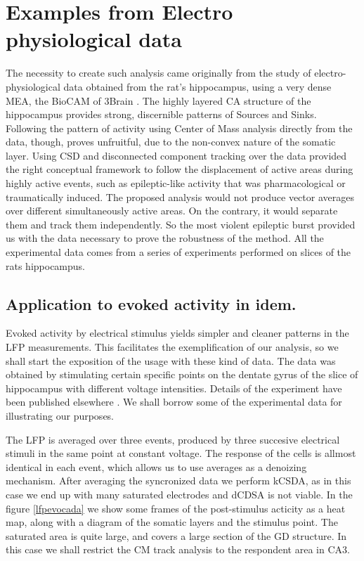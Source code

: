 \documentclass[12pt]{article}
\begin{document}
 
\section{Examples from Electro physiological data}

The necessity to create such analysis came originally from the study of
electro-physiological data obtained from the rat's hippocampus, using
a very dense MEA, the BioCAM of 3Brain \cite{BioCAM}. 
The highly layered CA structure of the hippocampus provides strong, discernible patterns of Sources and Sinks. Following the pattern of activity using Center of Mass analysis directly from the data, though, proves unfruitful, due to the non-convex nature of the somatic layer. Using CSD and disconnected component tracking over the data provided the right conceptual framework to follow the displacement of active areas during highly active events, such as epileptic-like activity that was pharmacological
or traumatically induced. The proposed analysis would not produce vector averages over different simultaneously active areas. On the contrary, it would separate them and track them independently. So the most violent epileptic burst provided us with the data necessary to prove the robustness of the method.
All the experimental data comes from a series of experiments
performed on slices of the rats hippocampus. 



\subsection{Application to evoked activity in idem.}\label{sec:evocada}

Evoked activity by electrical stimulus yields simpler and cleaner patterns in the LFP
measurements. This facilitates the exemplification of our analysis, so we shall
start the exposition of the usage with these kind of data.
The data was obtained by stimulating certain specific points on the dentate gyrus
of the slice of hippocampus with different voltage intensities. Details of the experiment
have been published elsewhere \cite{Franco2018}. We shall borrow some of
the experimental data for illustrating our purposes.

The LFP is averaged over three events, produced by three succesive
electrical stimuli in the same point at constant voltage. The
response of the cells is allmost identical in each event, which
allows us to use averages as a denoizing mechanism. After averaging
the syncronized data we perform kCSDA, as in this case we end up
with many saturated electrodes and dCDSA is not viable.
In the figure \ref{lfpevocada} we show some frames of the post-stimulus
acticity as a heat map, along
with a diagram of the somatic layers and the
stimulus point. The saturated area is quite large, and covers
a large section of the GD structure. In this case we shall
restrict the CM track analysis to the respondent area in CA3.
\end{document}
